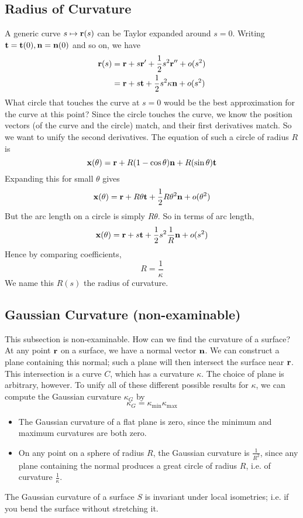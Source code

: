 \subsection{Radius of Curvature}
A generic curve \(s \mapsto \vb r(s)\) can be Taylor expanded around \(s=0\). Writing \(\vb t = \vb t(0), \vb n = \vb n(0)\) and so on, we have
\begin{align*}
	\vb r(s) & = \vb r + s\vb r' + \frac{1}{2}s^2 \vb r'' + o(s^2)    \\
	         & = \vb r + s\vb t + \frac{1}{2}s^2 \kappa\vb n + o(s^2)
\end{align*}
What circle that touches the curve at \(s=0\) would be the best approximation for the curve at this point? Since the circle touches the curve, we know the position vectors (of the curve and the circle) match, and their first derivatives match. So we want to unify the second derivatives. The equation of such a circle of radius \(R\) is
\[ \vb x(\theta) = \vb r + R(1 - \cos \theta)\vb n + R(\sin \theta) \vb t \]
Expanding this for small \(\theta\) gives
\[ \vb x(\theta) = \vb r + R\theta\vb t + \frac{1}{2} R\theta^2\vb n + o(\theta^2) \]
But the arc length on a circle is simply \(R\theta\). So in terms of arc length,
\[ \vb x(\theta) = \vb r + s\vb t + \frac{1}{2} s^2 \frac{1}{R}\vb n + o(s^2) \]
Hence by comparing coefficients,
\[ R = \frac{1}{\kappa} \]
We name this \(R(s)\) the radius of curvature.

\subsection{Gaussian Curvature (non-examinable)}
This subsection is non-examinable. How can we find the curvature of a surface? At any point \(\vb r\) on a surface, we have a normal vector \(\vb n\). We can construct a plane containing this normal; such a plane will then intersect the surface near \(\vb r\). This intersection is a curve \(C\), which has a curvature \(\kappa\). The choice of plane is arbitrary, however. To unify all of these different possible results for \(\kappa\), we can compute the Gaussian curvature \(\kappa_G\) by
\[ \kappa_G = \kappa_{\text{min}} \kappa_{\text{max}} \]
\begin{itemize}
	\item The Gaussian curvature of a flat plane is zero, since the minimum and maximum curvatures are both zero.
	\item On any point on a sphere of radius \(R\), the Gaussian curvature is \(\frac{1}{R^2}\), since any plane containing the normal produces a great circle of radius \(R\), i.e. of curvature \(\frac{1}{\kappa}\).
\end{itemize}

\begin{theorem}
	The Gaussian curvature of a surface \(S\) is invariant under local isometries; i.e. if you bend the surface without stretching it.
\end{theorem}
